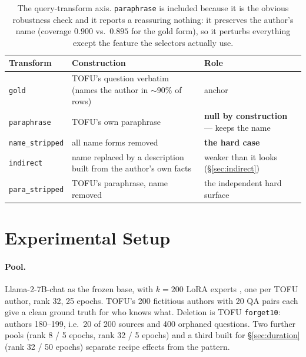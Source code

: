 \documentclass[11pt]{article}
\begin{document}
\begin{table}[t]
\centering
\small
\begin{tabular}{@{}lp{}p{}@{}}
\toprule
Transform & Construction & Role \\
\midrule
\texttt{gold}           & TOFU's question verbatim (names the author in ${\sim}90\%$ of rows) & anchor \\
\texttt{paraphrase}     & TOFU's own paraphrase & \textbf{null by construction} --- keeps the name \\
\texttt{name\_stripped} & all name forms removed & \textbf{the hard case} \\
\texttt{indirect}       & name replaced by a description built from the author's own facts & weaker than it looks (\S\ref{sec:indirect}) \\
\texttt{para\_stripped} & TOFU's paraphrase, name removed & the independent hard surface \\
\bottomrule
\end{tabular}
\caption{The query-transform axis. \texttt{paraphrase} is included because it is the obvious
robustness check and it reports a reassuring nothing: it preserves the author's name (coverage
$0.900$ vs.\ $0.895$ for the gold form), so it perturbs everything except the feature the selectors
actually use.}
\label{tab:transforms}
\end{table}

\section{Experimental Setup}
\label{sec:setup}

\paragraph{Pool.} Llama-2-7B-chat as the frozen base, with $k=200$ LoRA experts
\citep{hu2022lora}, one per TOFU author, rank 32, 25 epochs. TOFU's 200 fictitious authors with 20
QA pairs each give a clean ground truth for who knows what. Deletion is TOFU \texttt{forget10}:
authors 180--199, i.e.\ 20 of 200 sources and 400 orphaned questions. Two further pools (rank 8 /
5 epochs, rank 32 / 5 epochs) and a third built for \S\ref{sec:duration} (rank 32 / 50 epochs)
separate recipe effects from the pattern.
\end{document}
